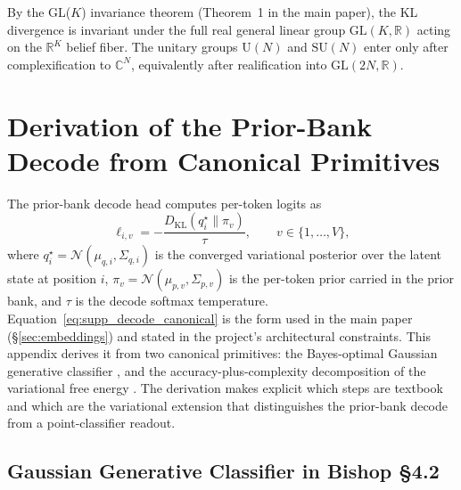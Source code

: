\documentclass[twoside,11pt]{article}
\begin{document}
By the GL($K$) invariance theorem (Theorem~1 in the main paper), the KL divergence is invariant under the full real general linear group $\mathrm{GL}(K,\mathbb{R})$ acting on the $\mathbb{R}^K$ belief fiber. The unitary groups $\mathrm{U}(N)$ and $\mathrm{SU}(N)$ enter only after complexification to $\mathbb{C}^N$, equivalently after realification into $\mathrm{GL}(2N,\mathbb{R})$.


\section{Derivation of the Prior-Bank Decode from Canonical Primitives}
\label{sec:supp_decode_derivation}

The prior-bank decode head computes per-token logits as
\begin{equation}
\ell_{i,v} = -\frac{D_{\mathrm{KL}}(q_i^{\star} \| \pi_v)}{\tau},
\qquad
v \in \{1,\dots,V\},
\label{eq:supp_decode_canonical}
\end{equation}
where $q_i^{\star} = \mathcal{N}(\mu_{q,i}, \Sigma_{q,i})$ is the converged variational posterior over the latent state at position $i$, $\pi_v = \mathcal{N}(\mu_{p,v}, \Sigma_{p,v})$ is the per-token prior carried in the prior bank, and $\tau$ is the decode softmax temperature. Equation~\eqref{eq:supp_decode_canonical} is the form used in the main paper (\S\ref{sec:embeddings}) and stated in the project's architectural constraints. This appendix derives it from two canonical primitives: the Bayes-optimal Gaussian generative classifier \cite[\S4.2]{Bishop2006}, and the accuracy-plus-complexity decomposition of the variational free energy \cite{Friston2010,Blei2017}. The derivation makes explicit which steps are textbook and which are the variational extension that distinguishes the prior-bank decode from a point-classifier readout.

\subsection{Gaussian Generative Classifier in Bishop \S4.2}
\end{document}
